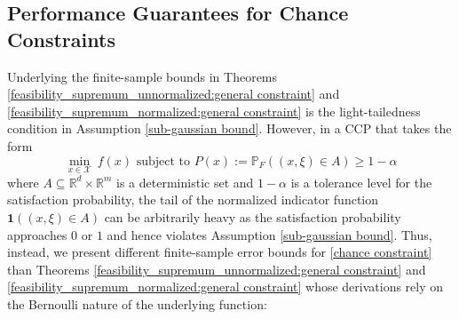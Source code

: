 \documentclass[mnsc,blindrev]{informs4} %
\newcommand{\R}{\mathbb{R}}
\begin{document}
\subsection{Performance Guarantees for Chance Constraints}
Underlying the finite-sample bounds in Theorems \ref{feasibility_supremum_unnormalized:general constraint} and \ref{feasibility_supremum_normalized:general constraint} is the light-tailedness condition in  Assumption \ref{sub-gaussian bound}. However, in a CCP that takes the form
\begin{equation}\label{chance constraint}
\min_{x\in\mathcal X}\ f(x)\text{\ \ subject to\ \ }P(x):=\mathbb P_{F}((x,\xi)\in A)\geq 1-\alpha
\end{equation}
where $A\subseteq \R^d\times \R^m$ is a deterministic set and $1-\alpha$ is a tolerance level for the satisfaction probability, the tail of the normalized indicator function $\mathbf{1}((x,\xi)\in A)$ can be arbitrarily heavy as the satisfaction probability approaches $0$ or $1$ and hence violates Assumption \ref{sub-gaussian bound}. Thus, instead, we present different finite-sample error bounds for \eqref{chance constraint} than Theorems \ref{feasibility_supremum_unnormalized:general constraint} and \ref{feasibility_supremum_normalized:general constraint} whose derivations rely on the Bernoulli nature of the underlying function:

\end{document}
